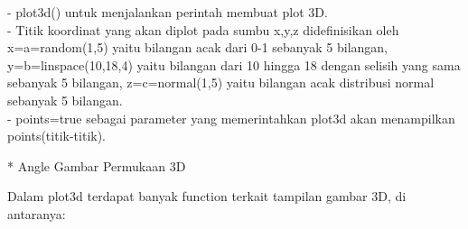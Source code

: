 \documentclass{article}
\begin{document}
\begin{eulernotebook}
\begin{eulercomment}
\begin{eulercomment}
\begin{eulercomment}
\begin{eulercomment}
\begin{eulercomment}
- plot3d() untuk menjalankan perintah membuat plot 3D.\\
- Titik koordinat yang akan diplot pada sumbu x,y,z didefinisikan oleh
x=a=random(1,5) yaitu bilangan acak dari 0-1 sebanyak 5 bilangan,
y=b=linspace(10,18,4) yaitu bilangan dari 10 hingga 18 dengan selisih
yang sama sebanyak 5 bilangan, z=c=normal(1,5) yaitu bilangan acak
distribusi normal sebanyak 5 bilangan.\\
- points=true sebagai parameter yang memerintahkan plot3d akan
menampilkan points(titik-titik).
\end{eulercomment}
\begin{eulercomment}

\begin{eulercomment}
\begin{eulercomment}
* Angle Gambar Permukaan 3D

Dalam plot3d terdapat banyak function terkait tampilan gambar 3D, di
antaranya:


\end{eulercomment}
\end{eulercomment}
\end{eulercomment}
\end{eulercomment}
\end{eulercomment}
\end{eulercomment}
\end{eulercomment}
\end{eulernotebook}
\end{document}
